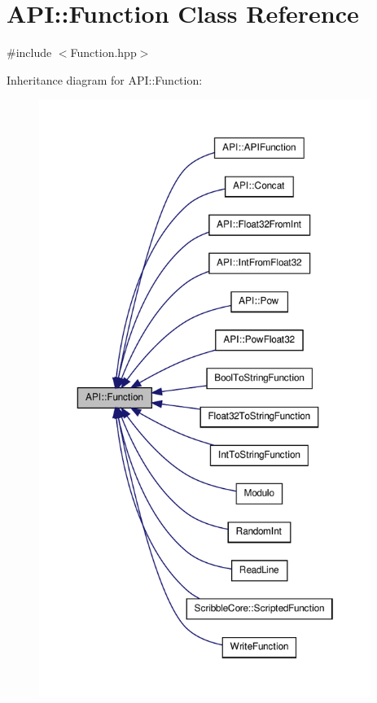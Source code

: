 \hypertarget{class_a_p_i_1_1_function}{\section{A\-P\-I\-:\-:Function Class Reference}
\label{class_a_p_i_1_1_function}
}


{\ttfamily \#include $<$Function.\-hpp$>$}



Inheritance diagram for A\-P\-I\-:\-:Function\-:\nopagebreak
\begin{figure}[H]
\begin{center}
\leavevmode
\includegraphics[height=550pt]{class_a_p_i_1_1_function__inherit__graph}
\end{center}
\end{figure}
